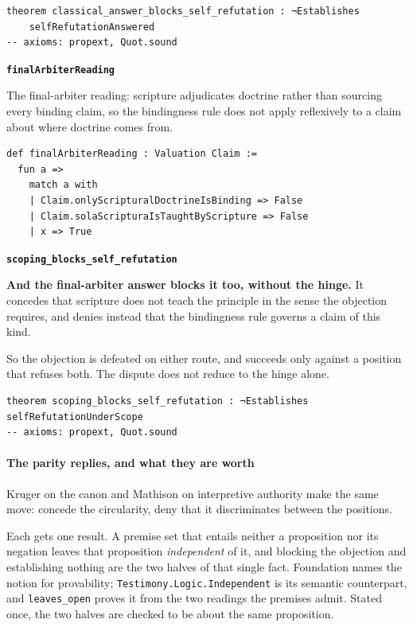 \documentclass[11pt]{article}
\begin{document}
{\small\begin{verbatim}
theorem classical_answer_blocks_self_refutation : ¬Establishes
    selfRefutationAnswered
-- axioms: propext, Quot.sound
\end{verbatim}}
\par\medskip\noindent\textbf{\texttt{final\allowbreak{}Arbiter\allowbreak{}Reading}}\par\nobreak\noindent
The final-arbiter reading: scripture adjudicates doctrine rather than sourcing every binding claim, so the bindingness rule does not apply reflexively to a claim about where doctrine comes from.

{\small\begin{verbatim}
def finalArbiterReading : Valuation Claim :=
  fun a =>
    match a with
    | Claim.onlyScripturalDoctrineIsBinding => False
    | Claim.solaScripturaIsTaughtByScripture => False
    | x => True
\end{verbatim}}
\par\medskip\noindent\textbf{\texttt{scoping\_\allowbreak{}blocks\_\allowbreak{}self\_\allowbreak{}refutation}}\par\nobreak\noindent
\textbf{And the final-arbiter answer blocks it too, without the hinge.} It concedes that scripture does not teach the principle in the sense the objection requires, and denies instead that the bindingness rule governs a claim of this kind.

So the objection is defeated on either route, and succeeds only against a position that refuses both. The dispute does not reduce to the hinge alone.

{\small\begin{verbatim}
theorem scoping_blocks_self_refutation : ¬Establishes selfRefutationUnderScope
-- axioms: propext, Quot.sound
\end{verbatim}}
\paragraph*{The parity replies, and what they are worth}
\leavevmode\par\nobreak
Kruger on the canon and Mathison on interpretive authority make the same move: concede the circularity, deny that it discriminates between the positions.

Each gets one result. A premise set that entails neither a proposition nor its negation leaves that proposition \emph{independent} of it, and blocking the objection and establishing nothing are the two halves of that single fact. Foundation names the notion for provability; \texttt{Testimony.Logic.Independent} is its semantic counterpart, and \texttt{leaves\_\allowbreak{}open} proves it from the two readings the premises admit. Stated once, the two halves are checked to be about the same proposition.
\end{document}
